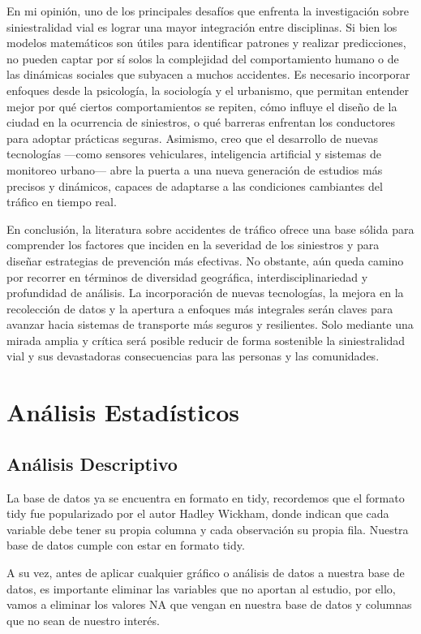 \documentclass{book}
\begin{document}
En mi opinión, uno de los principales desafíos que enfrenta la investigación sobre siniestralidad vial es lograr una mayor integración entre disciplinas. Si bien los modelos matemáticos son útiles para identificar patrones y realizar predicciones, no pueden captar por sí solos la complejidad del comportamiento humano o de las dinámicas sociales que subyacen a muchos accidentes. Es necesario incorporar enfoques desde la psicología, la sociología y el urbanismo, que permitan entender mejor por qué ciertos comportamientos se repiten, cómo influye el diseño de la ciudad en la ocurrencia de siniestros, o qué barreras enfrentan los conductores para adoptar prácticas seguras. Asimismo, creo que el desarrollo de nuevas tecnologías ---como sensores vehiculares, inteligencia artificial y sistemas de monitoreo urbano--- abre la puerta a una nueva generación de estudios más precisos y dinámicos, capaces de adaptarse a las condiciones cambiantes del tráfico en tiempo real.

En conclusión, la literatura sobre accidentes de tráfico ofrece una base sólida para comprender los factores que inciden en la severidad de los siniestros y para diseñar estrategias de prevención más efectivas. No obstante, aún queda camino por recorrer en términos de diversidad geográfica, interdisciplinariedad y profundidad de análisis. La incorporación de nuevas tecnologías, la mejora en la recolección de datos y la apertura a enfoques más integrales serán claves para avanzar hacia sistemas de transporte más seguros y resilientes. Solo mediante una mirada amplia y crítica será posible reducir de forma sostenible la siniestralidad vial y sus devastadoras consecuencias para las personas y las comunidades.

\section{Análisis Estadísticos}

\subsection{Análisis Descriptivo}

La base de datos ya se encuentra en formato en tidy, recordemos que el formato tidy fue popularizado por el autor Hadley Wickham, donde indican que cada variable debe tener su propia columna y cada observación su propia fila. Nuestra base de datos cumple con estar en formato tidy.

A su vez, antes de aplicar cualquier gráfico o análisis de datos a nuestra base de datos, es importante eliminar las variables que no aportan al estudio, por ello, vamos a eliminar los valores NA que vengan en nuestra base de datos y columnas que no sean de nuestro interés.
\end{document}
